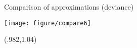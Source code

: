 \begin{frame}{Comparison of approximations (deviance)}
  \vspace{-5pt}
  \begin{center}
    \texttt{[image: figure/compare6]}
  \end{center}

  \begin{textblock*}{3cm}(.982\textwidth,1.04\textheight)%
    \hyperlink{quality}{}      
  \end{textblock*}  
\end{frame}
